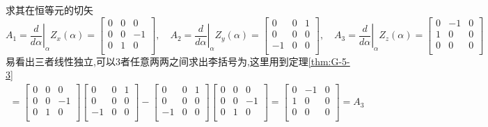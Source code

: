 \documentclass[../main.tex]{subfiles}
\begin{document}
 求其在恒等元的切矢$$
 A_1 = \left.\frac{d}{d\alpha}\right|_\alpha Z_x(\alpha)= \begin{bmatrix}
     0&0&0\\    
     0&0&-1\\
     0&1&0\\    
 \end{bmatrix},\quad
 A_2 = \left.\frac{d}{d\alpha}\right|_\alpha Z_y(\alpha)=  \begin{bmatrix}
     0&0&1\\    
     0&0&0\\
     -1&0&0\\    
 \end{bmatrix},\quad
 A_3 = \left.\frac{d}{d\alpha}\right|_\alpha Z_z(\alpha)=  \begin{bmatrix}
     0&-1&0\\    
     1&0&0\\
     0&0&0\\    
 \end{bmatrix}$$
 易看出三者线性独立,可以3者任意两两之间求出李括号为,这里用到定理\ref{thm:G-5-3}
 \begin{align*}
     [A_1,A_2] = \begin{bmatrix}
     0&0&0\\    
     0&0&-1\\
     0&1&0\\    
 \end{bmatrix} \begin{bmatrix}
     0&0&1\\    
     0&0&0\\
     -1&0&0\\    
 \end{bmatrix}-
 \begin{bmatrix}
     0&0&1\\    
     0&0&0\\
    -1&0&0\\    
 \end{bmatrix} \begin{bmatrix}
     0&0&0\\    
     0&0&-1\\
     0&1&0\\    
 \end{bmatrix}= \begin{bmatrix}
     0&-1&0\\    
     1&0&0\\
     0&0&0\\    
 \end{bmatrix}
 =A_3
 \end{align*}
\end{document}
